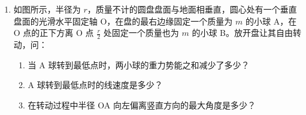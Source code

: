 \documentclass[\gkver]{gaokaozhenti}
\begin{document}
\begin{enumerate}
{$p_{0\text{左}}hS = p_{\text{左}}\cdot 2.5hS$　①

$p_{0\text{右}}hS = p_{\text{右}}\cdot 1.5hS$　②

但 $p_{0\text{左}} = p_{0\text{右}}$　③

$p_{\text{右}} - p_{\text{左}} = \rho gh$　④

由①、②、③得 $2.5p_{\text{左}}h = 1.5p_{\text{右}}h$，

④代入上式得 $2.5p_{\text{左}} = 1.5(p_{\text{左}} + \rho gh)$，

得 $p_{\text{左}} = 1.5\rho gh$。

代入①式得 $p_{0\text{左}} = p_{0\text{右}} = 2.5p_{\text{左}} = \frac{5}{2}\cdot\frac{3}{2}\rho gh = \frac{15}{4}\rho gh$。

\textbf{评分标准}：列出①、②、④各 2 分，列出③ 1 分，得出结果 3 分。
}

\item
如图所示，半径为 $r$，质量不计的圆盘盘面与地面相垂直，圆心处有一个垂直盘面的光滑水平固定轴 O，在盘的最右边缘固定一个质量为 $m$ 的小球 A，在 O 点的正下方离 O 点 $\frac{r}{2}$ 处固定一个质量也为 $m$ 的小球 B。放开盘让其自由转动，问：
\begin{enumerate}
	\item
	当 A 球转到最低点时，两小球的重力势能之和减少了多少？
	\item
	A 球转到最低点时的线速度是多少？
	\item
	在转动过程中半径 OA 向左偏离竖直方向的最大角度是多少？
\end{enumerate}
\onepicture[align=right, w=3.34cm]{}
\end{enumerate}
\end{document}

